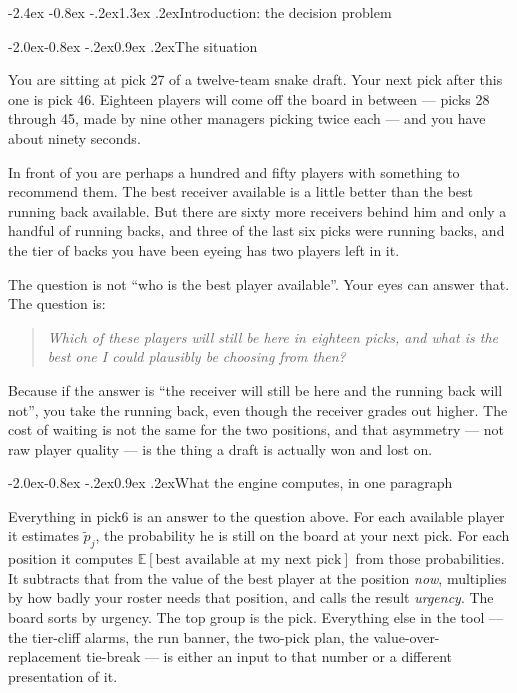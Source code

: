 \documentclass[10pt,a4paper]{article}
\makeatletter
\theoremstyle{plain}
\theoremstyle{definition}
\theoremstyle{remark}
\renewcommand\section{\@startsection{section}{1}{\z@}%
  {-2.4ex \@plus -0.8ex \@minus -.2ex}{1.3ex \@plus.2ex}{\normalfont\Large\bfseries}}
\renewcommand\subsection{\@startsection{subsection}{2}{\z@}%
  {-2.0ex\@plus -0.8ex \@minus -.2ex}{0.9ex \@plus .2ex}{\normalfont\large\bfseries}}
\makeatother
\begin{document}
\setcounter{tocdepth}{1}
\tableofcontents
\newpage

\section{Introduction: the decision problem}

\subsection{The situation}

You are sitting at pick 27 of a twelve-team snake draft. Your next pick after this one
is pick 46. Eighteen players will come off the board in between --- picks 28 through 45,
made by nine other managers picking twice each --- and you have about ninety seconds.

In front of you are perhaps a hundred and fifty players with something to recommend
them. The best receiver available is a little better than the best running back
available. But there are sixty more receivers behind him and only a handful of running
backs, and three of the last six picks were running backs, and the tier of backs you
have been eyeing has two players left in it.

The question is not ``who is the best player available''. Your eyes can answer that.
The question is:

\begin{quote}
\emph{Which of these players will still be here in eighteen picks, and what is the
best one I could plausibly be choosing from then?}
\end{quote}

Because if the answer is ``the receiver will still be here and the running back will
not'', you take the running back, even though the receiver grades out higher. The cost
of waiting is not the same for the two positions, and that asymmetry --- not raw
player quality --- is the thing a draft is actually won and lost on.

\subsection{What the engine computes, in one paragraph}

Everything in pick6 is an answer to the question above. For each available player it
estimates $\tilde p_j$, the probability he is still on the board at your next pick.
For each position it computes $\mathbb{E}[\text{best available at my next pick}]$ from
those probabilities. It subtracts that from the value of the best player at the
position \emph{now}, multiplies by how badly your roster needs that position, and calls
the result \emph{urgency}. The board sorts by urgency. The top group is the pick.
Everything else in the tool --- the tier-cliff alarms, the run banner, the two-pick
plan, the value-over-replacement tie-break --- is either an input to that number or a
different presentation of it.
\end{document}
